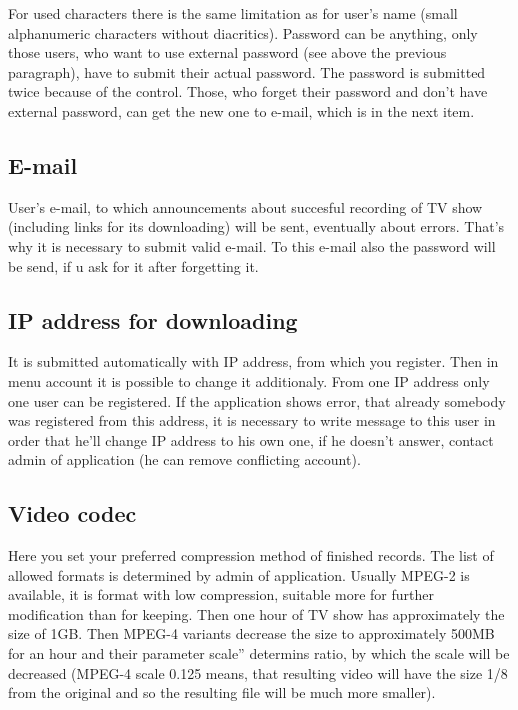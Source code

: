 For used characters there is the same limitation as for user's name (small alphanumeric characters without diacritics). Password can be anything, only those users, who want to use external password (see above the previous paragraph), have to submit their actual password. The password is submitted twice because of the control. Those, who forget their password and don't have external password, can get the new one to e-mail, which is in the next item.

\subsection{E-mail}

User's e-mail, to which announcements about succesful recording of TV show (including links for its downloading) will be sent, eventually about errors. That's why it is necessary to submit valid e-mail. To this e-mail also the password will be send, if u ask for it after forgetting it.

\subsection{IP address for downloading}

It is submitted automatically with IP address, from which you register. Then in menu account it is possible to change it additionaly. From one IP address only one user can be registered. If the application shows error, that already somebody was registered from this address, it is necessary to write message to this user in order that he'll change IP address to his own one, if he doesn't answer, contact admin of application (he can remove conflicting account).

\subsection{Video codec}

Here you set your preferred compression method of finished records. The list of allowed formats is determined by admin of application. Usually MPEG-2 is available, it is format with low compression, suitable more for further modification than for keeping. Then one hour of TV show has approximately the size of 1GB. Then MPEG-4 variants decrease the size to approximately 500MB for an hour and their parameter \quotedblbase scale'' determins ratio, by which the scale will be decreased (MPEG-4 scale 0.125 means, that resulting video will have the size 1/8 from the original and so the resulting file will be much more smaller).

